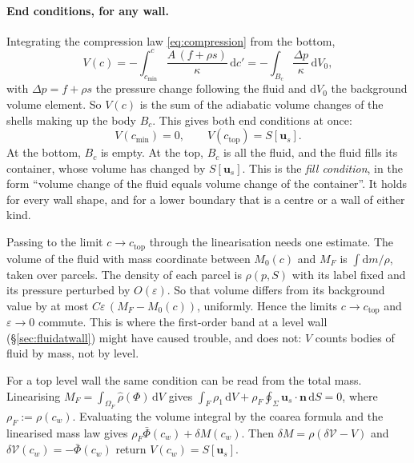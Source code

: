 \documentclass[11pt]{article}
\theoremstyle{definition}
\theoremstyle{remark}
\newcommand{\bu}{\mathbf{u}}
\newcommand{\bn}{\mathbf{n}}
\newcommand{\dS}{\,\mathrm{d}S}
\newcommand{\dV}{\,\mathrm{d}V}
\newcommand{\Vol}{\mathcal V}
\begin{document}
\paragraph{End conditions, for any wall.} Integrating the compression
law \eqref{eq:compression} from the bottom,
\begin{equation}
  V(c) = -\int_{c_{\min}}^{c}\frac{A\,(f + \rho s)}{\kappa}\,\mathrm dc'
  = -\int_{B_c}\frac{\Delta p}{\kappa}\,\mathrm dV_0 ,
  \label{eq:Vsum}
\end{equation}
with $\Delta p = f + \rho s$ the pressure change following the fluid
and $\mathrm dV_0$ the background volume element. So $V(c)$ is the sum
of the adiabatic volume changes of the shells making up the body
$B_c$. This gives both end conditions at once:
\begin{equation}
  V(c_{\min}) = 0,\qquad V(c_{\mathrm{top}}) = S[\bu_s] .
  \label{eq:bcs}
\end{equation}
At the bottom, $B_c$ is empty. At the top, $B_c$ is all the fluid, and
the fluid fills its container, whose volume has changed by $S[\bu_s]$.
This is the \emph{fill condition}, in the form ``volume change of the
fluid equals volume change of the container''. It holds for every wall
shape, and for a lower boundary that is a centre or a wall of either
kind.

Passing to the limit $c \to c_{\mathrm{top}}$ through the linearisation
needs one estimate. The volume of the fluid with mass coordinate
between $M_0(c)$ and $M_F$ is $\int\mathrm dm/\rho$, taken over
parcels. The density of each parcel is $\rho(p, S)$ with its label
fixed and its pressure perturbed by $O(\varepsilon)$. So that volume
differs from its background value by at most $C\varepsilon\,(M_F -
M_0(c))$, uniformly. Hence the limits $c \to c_{\mathrm{top}}$ and
$\varepsilon \to 0$ commute. This is where the first-order band at a
level wall (\S\ref{sec:fluidatwall}) might have caused trouble, and
does not: $V$ counts bodies of fluid by mass, not by level.

For a top level wall the same condition can be read from the total
mass. Linearising $M_F =
\int_{\Omega_F}\hat\rho(\Phi)\dV$ gives $\int_F\rho_1\dV +
\rho_F\oint_\Sigma\bu_s\cdot\bn\dS = 0$, where $\rho_F := \rho(c_w)$.
Evaluating the volume integral by the coarea formula and the
linearised mass law gives $\rho_F\bar\Phi(c_w) + \delta M(c_w)$. Then
$\delta M = \rho(\delta\Vol - V)$ and $\delta\Vol(c_w) = -\bar\Phi(c_w)$
return $V(c_w) = S[\bu_s]$.
\end{document}

